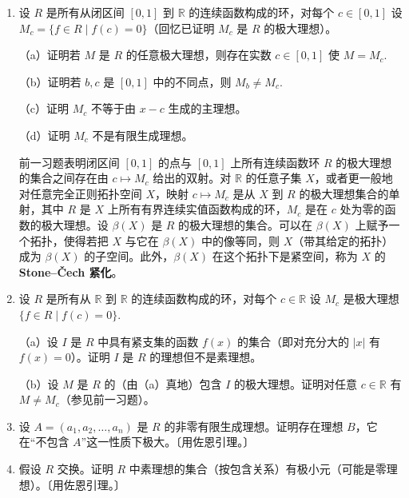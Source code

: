 \begin{enumerate}
（b）证明 \(\operatorname{rad} I \subseteq \operatorname{Jac} I\)，其中 \(\operatorname{rad} I\) 是习题 30 中定义的 \(I\) 的根。

（c）设 \(n > 1\) 是整数。用 \(n\) 的素因子分解描述 \(\operatorname{Jac} n\mathbb{Z}\).

\item 设 \(R\) 是所有从闭区间 \([0,1]\) 到 \(\mathbb{R}\) 的连续函数构成的环，对每个 \(c \in [0,1]\) 设 \(M_c = \{f \in R \mid f(c) = 0\}\)（回忆已证明 \(M_c\) 是 \(R\) 的极大理想）。

（a）证明若 \(M\) 是 \(R\) 的任意极大理想，则存在实数 \(c \in [0,1]\) 使 \(M = M_c\).

（b）证明若 \(b, c\) 是 \([0,1]\) 中的不同点，则 \(M_b \neq M_c\).

（c）证明 \(M_c\) 不等于由 \(x-c\) 生成的主理想。

（d）证明 \(M_c\) 不是有限生成理想。

\noindent 前一习题表明闭区间 \([0,1]\) 的点与 \([0,1]\) 上所有连续函数环 \(R\) 的极大理想的集合之间存在由 \(c \mapsto M_c\) 给出的双射。对 \(\mathbb{R}\) 的任意子集 \(X\)，或者更一般地对任意完全正则拓扑空间 \(X\)，映射 \(c \mapsto M_c\) 是从 \(X\) 到 \(R\) 的极大理想集合的单射，其中 \(R\) 是 \(X\) 上所有有界连续实值函数构成的环，\(M_c\) 是在 \(c\) 处为零的函数的极大理想。设 \(\beta(X)\) 是 \(R\) 的极大理想的集合。可以在 \(\beta(X)\) 上赋予一个拓扑，使得若把 \(X\) 与它在 \(\beta(X)\) 中的像等同，则 \(X\)（带其给定的拓扑）成为 \(\beta(X)\) 的子空间。此外，\(\beta(X)\) 在这个拓扑下是紧空间，称为 \(X\) 的 \textbf{Stone--Čech 紧化}。

\item 设 \(R\) 是所有从 \(\mathbb{R}\) 到 \(\mathbb{R}\) 的连续函数构成的环，对每个 \(c \in \mathbb{R}\) 设 \(M_c\) 是极大理想 \(\{f \in R \mid f(c) = 0\}\).

（a）设 \(I\) 是 \(R\) 中具有紧支集的函数 \(f(x)\) 的集合（即对充分大的 \(|x|\) 有 \(f(x) = 0\)）。证明 \(I\) 是 \(R\) 的理想但不是素理想。

（b）设 \(M\) 是 \(R\) 的（由（a）真地）包含 \(I\) 的极大理想。证明对任意 \(c \in \mathbb{R}\) 有 \(M \neq M_c\)（参见前一习题）。

\item 设 \(A = (a_1, a_2, \ldots, a_n)\) 是 \(R\) 的非零有限生成理想。证明存在理想 \(B\)，它在“不包含 \(A\)”这一性质下极大。〔用佐恩引理。〕

\item 假设 \(R\) 交换。证明 \(R\) 中素理想的集合（按包含关系）有极小元（可能是零理想）。〔用佐恩引理。〕


\end{enumerate}
